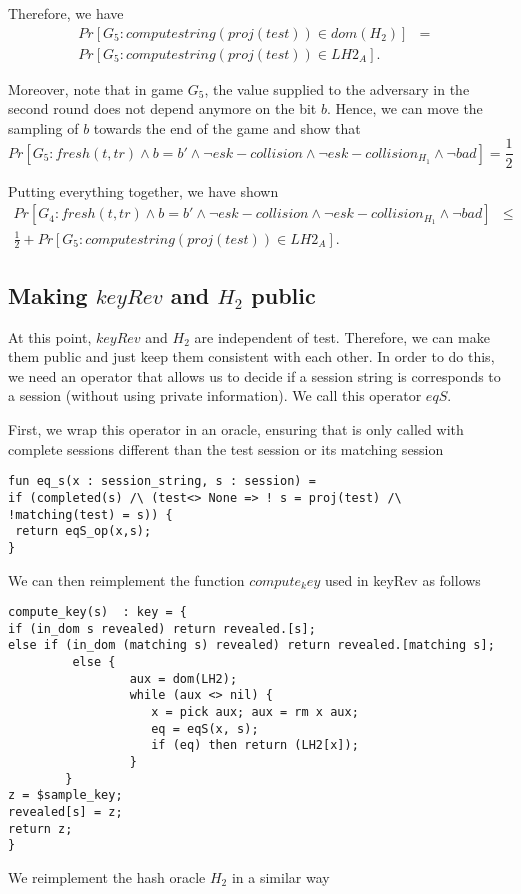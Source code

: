 \documentclass[]{article}
\begin{document}
Therefore, we have
\begin{align*}
 Pr[G_5 : computestring(proj(test)) \in dom(H_2) ]  &=& \\
 Pr[G_5 : computestring(proj(test)) \in LH2_A ].
\end{align*}

Moreover, note that in game $G_5$, the value supplied to the adversary in the second round does not depend anymore on the bit $b$. Hence, we can move the sampling of $b$ towards the end of the game and show that 
\[
  Pr[G_5 : fresh(t,tr) \land b = b' \land \neg esk-collision \land \neg esk-collision_{H_1} \land \neg bad] =
  \frac{1}{2}
\]

Putting everything together, we have shown 
\begin{align*}
  Pr[G_4 : fresh(t,tr) \land b = b' \land \neg esk-collision \land \neg esk-collision_{H_1} \land \neg bad]  &\leq&\\ 
\frac{1}{2} +  Pr[G_5 : computestring(proj(test)) \in LH2_A ].
\end{align*}

\subsection{Making $keyRev$ and $H_2$ public}
At this point, $keyRev$ and $H_2$ are independent of test. Therefore, we can make them public and just keep them consistent with each other. In order to do this, we need an operator that allows us to decide if a session string is corresponds to a session (without using private information). We call this operator $eqS$.

First, we wrap this operator in an oracle, ensuring that is only called with complete sessions different than the test session or its matching session

\begin{verbatim}
fun eq_s(x : session_string, s : session) =
if (completed(s) /\ (test<> None => ! s = proj(test) /\ !matching(test) = s)) {
 return eqS_op(x,s);	
}
\end{verbatim}

We can then reimplement the function $compute_key$ used in keyRev as follows

\begin{verbatim}
compute_key(s)  : key = {
if (in_dom s revealed) return revealed.[s];
else if (in_dom (matching s) revealed) return revealed.[matching s]; 
         else {
                 aux = dom(LH2);	
                 while (aux <> nil) {
                    x = pick aux; aux = rm x aux;
                    eq = eqS(x, s);
                    if (eq) then return (LH2[x]);
                 }
        }
z = $sample_key;
revealed[s] = z;
return z; 	
} 

\end{verbatim}
We reimplement  the hash oracle $H_2$ in a similar way
\end{document}

